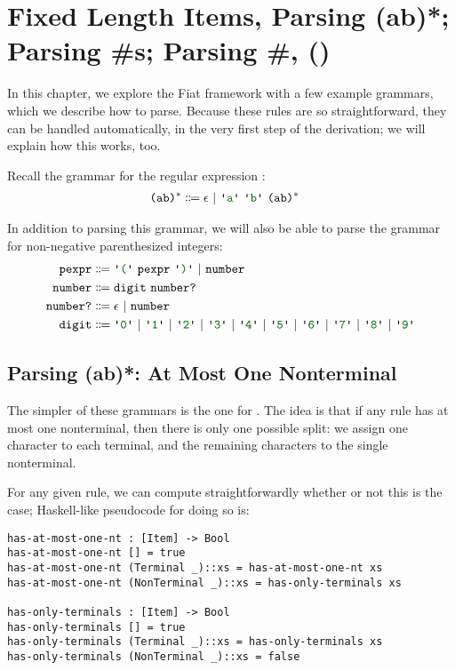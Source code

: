 \chapter{Fixed Length Items, Parsing (ab)*; Parsing \#s; Parsing \#, ()}
  In this chapter, we explore the Fiat framework with a few example grammars, which we describe how to parse.  Because these rules are so straightforward, they can be handled automatically, in the very first step of the derivation; we will explain how this works, too.

  Recall the grammar for the regular expression :
  \begin{align*}
    \nt{(ab)$^*$} & \Coloneqq \nt{$\epsilon$}~|~\terminal{a}~\terminal{b}~\nt{(ab)$^*$}
  \end{align*}

  In addition to parsing this grammar, we will also be able to parse the grammar for non-negative parenthesized integers:
  \begin{align*}
    \nt{pexpr} & \Coloneqq \terminal{(}~\nt{pexpr}~\terminal{)}~|~\nt{number} \\
    \nt{number} & \Coloneqq \nt{digit}~\nt{number?} \\
    \nt{number?} & \Coloneqq \epsilon~|~\nt{number} \\
    \nt{digit} & \Coloneqq \terminal{0}~|~\terminal{1}~|~\terminal{2}~|~\terminal{3}~|~\terminal{4}~|~\terminal{5}~|~\terminal{6}~|~\terminal{7}~|~\terminal{8}~|~\terminal{9}
  \end{align*}

  \section{Parsing (ab)*: At Most One Nonterminal}
    The simpler of these grammars is the one for .  The idea is that if any rule has at most one nonterminal, then there is only one possible split: we assign one character to each terminal, and the remaining characters to the single nonterminal.

    For any given rule, we can compute straightforwardly whether or not this is the case; Haskell-like pseudocode for doing so is:
\begin{verbatim}
has-at-most-one-nt : [Item] -> Bool
has-at-most-one-nt [] = true
has-at-most-one-nt (Terminal _)::xs = has-at-most-one-nt xs
has-at-most-one-nt (NonTerminal _)::xs = has-only-terminals xs

has-only-terminals : [Item] -> Bool
has-only-terminals [] = true
has-only-terminals (Terminal _)::xs = has-only-terminals xs
has-only-terminals (NonTerminal _)::xs = false
\end{verbatim}

